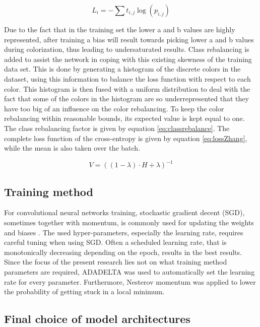 \begin{equation}
\label{eq:crossentropy}
L_{i} = -\sum t_{i,j}\log(p_{i,j})
\end{equation}

Due to the fact that in the training set the lower a and b values are highly represented, after training a bias will result towards picking lower a and b values during colorization, thus leading to undersaturated results. 
Class rebalancing is added to assist the network in coping with this existing skewness of the training data set. This is done by generating a histogram of the discrete colors in the dataset, using this information to balance the loss function with respect to each color. 
This histogram is then fused with a uniform distribution to deal with the fact that some of the colors in the histogram are so underrepresented that they have too big of an influence on the color rebalancing. To keep the color rebalancing within reasonable bounds, its expected value is kept equal to one. 
The class rebalancing factor is given by equation \ref{eq:classrebalance}. The complete loss function of the cross-entropy is given by equation \ref{eq:lossZhang}, while the mean is also taken over the batch.

\begin{equation}\label{eq:classrebalance}
V = ((1 - \lambda)\cdot H + \lambda)^{-1}
\end{equation}
 
\subsection{Training method}
For convolutional neural networks training, stochastic gradient decent (SGD), sometimes together with momentum, is commonly used for updating the weights and biases \cite{IizukaSIGGRAPH2016}\cite{Simonyan}. The used hyper-parameters, especially the learning rate, requires careful tuning when using SGD. Often a scheduled learning rate, that is monotonically decreasing depending on the epoch, results in the best results. Since the focus of the present research lies not on what training method parameters are required, ADADELTA was used to automatically set the learning rate for every parameter\cite{zeiler2012adadelta}. Furthermore, Nesterov momentum was applied to lower the probability of getting stuck in a local minimum\cite{sutskever2013importance}.


\subsection{Final choice of model architectures}

